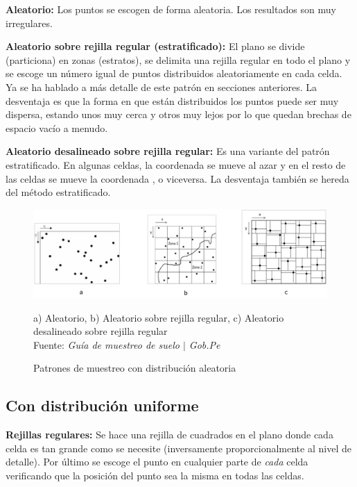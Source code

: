 \documentclass{report}
\begin{document}
\textbf{Aleatorio:} Los puntos se escogen de forma aleatoria. Los resultados son muy irregulares.

\bigbreak

\textbf{Aleatorio sobre rejilla regular (estratificado):} El plano se divide (particiona) en zonas (estratos), se delimita una rejilla regular en todo el plano y se escoge un número igual de puntos distribuidos aleatoriamente en cada celda. Ya se ha hablado a más detalle de este patrón en secciones anteriores. La desventaja es que la forma en que están distribuidos los puntos puede ser muy dispersa, estando unos muy cerca y otros muy lejos por lo que quedan brechas de espacio vacío a menudo.

\bigbreak

\textbf{Aleatorio desalineado sobre rejilla regular:} Es una variante del patrón estratificado. En algunas celdas, la coordenada  se mueve al azar y en el resto de las celdas se mueve la coordenada , o viceversa. La desventaja también se hereda del método estratificado.

\begin{figure}[H]
    \centering
    \includegraphics[width=0.7\paperwidth]{ref/random-sampling-patterns.png}
    \caption{Patrones de muestreo con distribución aleatoria}
    a) Aleatorio, b) Aleatorio sobre rejilla regular, c) Aleatorio desalineado sobre rejilla regular \\
    Fuente: \textit{Guía de muestreo de suelo $\mid$ Gob.Pe} \cite{gobpe-ministerio-del-ambiente-2014}
\end{figure}

\subsection{Con distribución uniforme}

\textbf{Rejillas regulares:} Se hace una rejilla de cuadrados en el plano donde cada celda es tan grande como se necesite (inversamente proporcionalmente al nivel de detalle). Por último se escoge el punto en cualquier parte de \textit{cada} celda verificando que la posición del punto sea la misma en todas las celdas.
\end{document}
